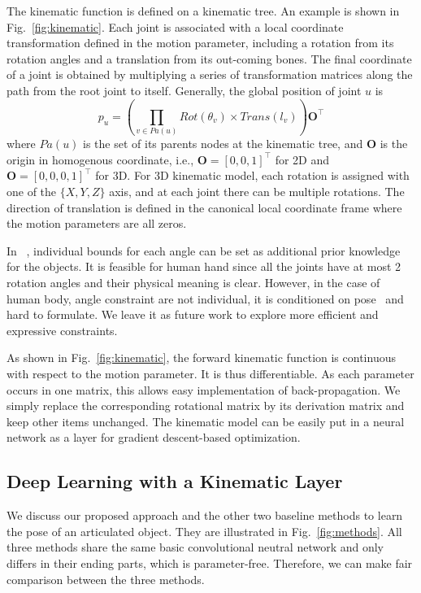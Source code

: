 \documentclass[runningheads]{llncs}
\begin{document}
The kinematic function is defined on a kinematic tree. An example is shown in Fig.~\ref{fig:kinematic}. Each joint is associated with a local coordinate transformation defined in the motion parameter, including a rotation from its rotation angles and a translation from its out-coming bones. The final coordinate of a joint is obtained by multiplying a series of transformation matrices along the path from the root joint to itself. Generally, the global position of joint $u$ is
\begin{equation} \label{eq:chain}
p_u = (\prod_{v \in Pa(u)}{Rot(\theta_v) \times Trans(l_v)}) \textbf{O} ^\top
\end{equation}
where $Pa(u)$ is the set of its parents nodes at the kinematic tree, and $\textbf{O}$ is the origin in homogenous coordinate, i.e., $\textbf{O} = [0, 0, 1] ^\top$ for 2D and  $\textbf{O} = [0, 0, 0, 1] ^\top$ for 3D.
For 3D kinematic model, each rotation is assigned with one of the $\{X, Y, Z\}$ axis, and at each joint there can be multiple rotations. The direction of translation is defined in the canonical local coordinate frame where the motion parameters are all zeros.

In ~\cite{zhou2016model}, individual bounds for each angle can be set as additional prior knowledge for the objects. It is feasible for human hand since all the joints have at most 2 rotation angles and their physical meaning is clear. However, in the case of human body, angle constraint are not individual, it is conditioned on pose~\cite{akhter2015pose} and hard to formulate. We leave it as future work to explore more efficient and expressive constraints.

As shown in Fig.~\ref{fig:kinematic}, the forward kinematic function is continuous with respect to the motion parameter. It is thus differentiable. As each parameter occurs in one matrix, this allows easy implementation of back-propagation. We simply replace the corresponding rotational matrix by its derivation matrix and keep other items unchanged. The kinematic model can be easily put in a neural network as a layer for gradient descent-based optimization.


\subsection{Deep Learning with a Kinematic Layer}
We discuss our proposed approach and the other two baseline methods to learn the pose of an articulated object. They are illustrated in Fig.~\ref{fig:methods}. All three methods share the same basic convolutional neutral network and only differs in their ending parts, which is parameter-free. Therefore, we can make fair comparison between the three methods.
\end{document}
